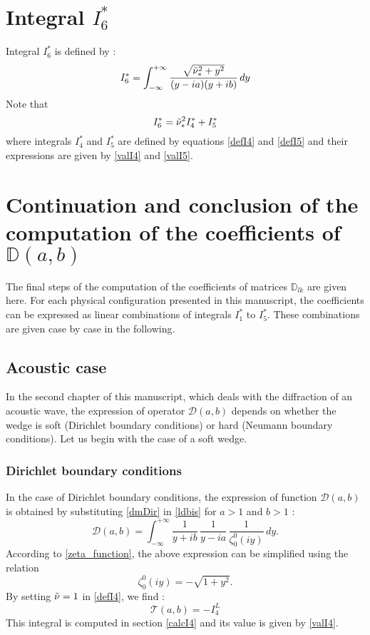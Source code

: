 \section{Integral $I_6^*$}
\label{calcI6}
Integral $I_6^*$ is defined by :
\begin{equation}
I_6^*=\int_{-\infty}^{+\infty}\frac{\sqrt{\tilde{\nu}_*^2+y^2}}{(y-ia)(y+ib)}\,dy
\label{defI6}
\end{equation}
Note that
\begin{equation}
I_6^*=\tilde{\nu}^2_* I_4^*+I_5^*
\end{equation}
where integrals $I_4^*$ and $I_5^*$ are defined by equations \eqref{defI4} and \eqref{defI5} and their expressions are given by \eqref{valI4} and \eqref{valI5}.

\section{Continuation and conclusion of the computation of the coefficients of $\mathbb{D}(a,b)$}
\label{fincalculsD}
The final steps of the computation of the coefficients of matrices $\mathbb{D}_{lk}$ are given here. For each physical configuration presented in this manuscript, the coefficients can be expressed as linear combinations of integrals $I_1^*$ to $I_5^*$. These combinations are given case by case in the following.

\subsection{Acoustic case}
\label{finalDac}
In the second chapter of this manuscript, which deals with the diffraction of an acoustic wave, the expression of operator $\mathcal{D}(a,b)$ depends on whether the wedge is soft (Dirichlet boundary conditions) or hard (Neumann boundary conditions). Let us begin with the case of a soft wedge.  
\subsubsection{Dirichlet boundary conditions}
\label{finalDacDir}
In the case of Dirichlet boundary conditions, the expression of function $\mathcal{D}(a,b)$ is obtained by substituting \eqref{dmDir} in \eqref{ldbis} for $a>1$ and $b>1$ :
\begin{equation}
\mathcal{D}(a,b) = \int_{-\infty}^{+\infty} \dfrac{1}{ y+ib} \, \dfrac{1}{y -i a} \,\dfrac{1}{\zeta_0^0(iy)} \, dy . 
\end{equation}
According to \eqref{zeta_function}, the above expression can be simplified using the relation
\begin{equation}
\zeta_0^0(iy)= - \sqrt{1+y^2}.
\label{Appendix:zeta0iy}
\end{equation}
By setting $\tilde{\nu}=1$ in \eqref{defI4}, we find :
\begin{equation}
\mathcal{T}(a,b)=-I_4^L
\end{equation}
This integral is computed in section \ref{calcI4} and its value is given by \eqref{valI4}.
